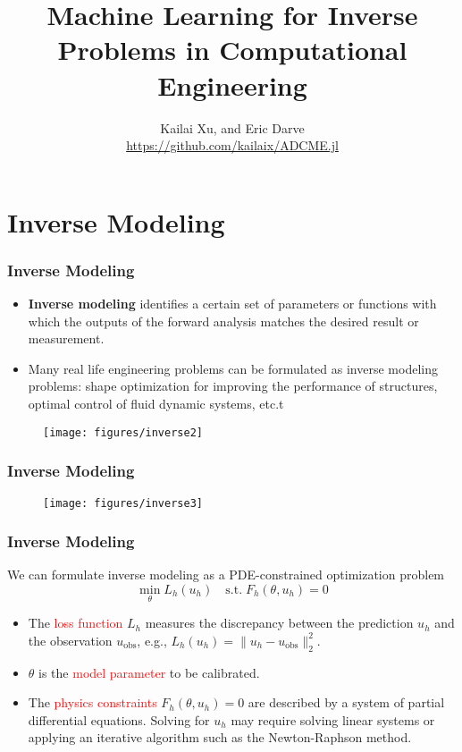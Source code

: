 \documentclass[usenames,dvipsnames]{beamer}
\title[ML for Computational Engineering]{Machine Learning for Inverse Problems in Computational Engineering} %
\author[ADCME]{Kailai Xu, and Eric Darve \\ \url{https://github.com/kailaix/ADCME.jl}} %
\date{}%
\begin{document}
\begin{frame}

\titlepage %

\end{frame}
\usebackgroundtemplate{}

\section{Inverse Modeling}




\begin{frame}
	\frametitle{Inverse Modeling}
	\begin{itemize}
		\item \textbf{Inverse modeling} identifies a certain set of parameters or functions with which the outputs of the forward analysis matches the desired result or measurement.
		\item Many real life engineering problems can be formulated as inverse modeling problems: shape optimization for improving the performance of structures, optimal control of fluid dynamic systems, etc.t
	\end{itemize}
	\begin{figure}[hbt]
		\centering
		\texttt{[image: figures/inverse2]}
	\end{figure}
\end{frame}


\begin{frame}
	\frametitle{Inverse Modeling}
	\begin{figure}
	\centering
  \texttt{[image: figures/inverse3]}
\end{figure}
\end{frame}

\begin{frame}
	\frametitle{Inverse Modeling}
	We can formulate inverse modeling as a PDE-constrained optimization problem 
	\begin{equation*}
		\min_{\theta} L_h(u_h) \quad \mathrm{s.t.}\; F_h(\theta, u_h) = 0
	\end{equation*}
	\begin{itemize}
		\item The \textcolor{red}{loss function} $L_h$ measures the discrepancy between the prediction $u_h$ and the observation $u_{\mathrm{obs}}$, e.g., $L_h(u_h) = \|u_h - u_{\mathrm{obs}}\|_2^2$. 
		\item $\theta$ is the \textcolor{red}{model parameter} to be calibrated. 
		\item The \textcolor{red}{physics constraints} $F_h(\theta, u_h)=0$ are described by a system of partial differential equations. Solving for $u_h$ may require solving linear systems or applying an iterative algorithm such as the Newton-Raphson method. 
	\end{itemize}
\end{frame}
\end{document}
